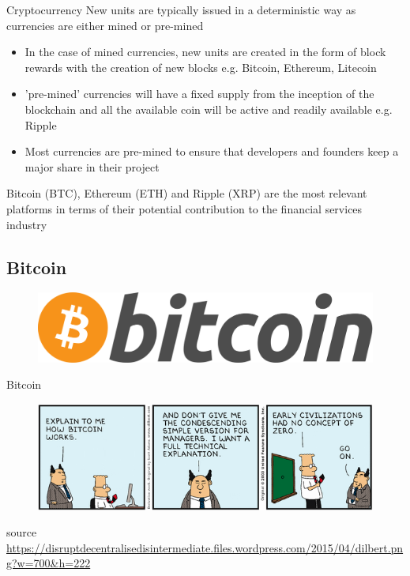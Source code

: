 \documentclass[11pt]{beamer}
\begin{document}
\begin{frame}{Cryptocurrency}
		New units are typically issued in a deterministic way as currencies are either mined or pre-mined
	\begin{itemize}
		\item In the case of mined currencies, new units are created in the form of block rewards with the creation of new blocks e.g. Bitcoin, Ethereum, Litecoin
		\item 'pre-mined' currencies will have a fixed supply from the inception of the blockchain and all the available coin will be active and readily available e.g. Ripple
		\item Most currencies are pre-mined to ensure that developers and founders keep a major share in their project
	\end{itemize}
	Bitcoin (BTC), Ethereum (ETH) and Ripple (XRP) are the most relevant platforms in terms of their potential contribution to the financial services industry
\end{frame}


\subsection{Bitcoin}

\begin{frame}
	\begin{figure}[]
		\centering
		\includegraphics  [scale=0.1]{Images/bitcoin-logo}
	\end{figure}
\end{frame}


\begin{frame}{Bitcoin}
	\begin{figure}[]
		\centering
		\includegraphics  [scale=0.5]{Images/dilbert-bitcoin}
	\end{figure}
	\begin{scriptsize}
		source \href{https://disruptdecentralisedisintermediate.files.wordpress.com/2015/04/dilbert.png?w=700&h=222}{https://disruptdecentralisedisintermediate.files.wordpress.com/2015/04/dilbert.png?w=700\&h=222}
	\end{scriptsize}

\end{frame}
\end{document}

